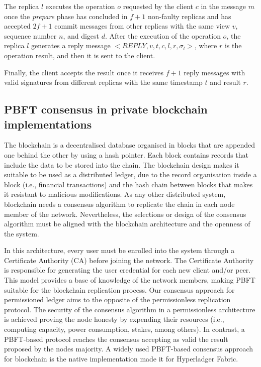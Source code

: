 \documentclass[conference]{IEEEtran}
\begin{document}
The replica $l$ executes the operation $o$ requested by the client $c$ in the message $m$ once the \textit{prepare} phase has concluded in $f+1$ non-faulty replicas and has accepted $2f+1$ commit messages from other replicas with the same view $v$, sequence number $n$, and digest $d$. After the execution of the operation $o$, the replica $l$ generates a reply message $<\textit{REPLY},v,t,c,l,r,\sigma_l>$, where $r$ is the operation result, and then it is sent to the client.

Finally, the client accepts the result once it receives $f+1$ reply messages with valid signatures from different replicas with the same timestamp $t$ and result $r$.

\subsection{PBFT consensus in private blockchain implementations}
\label{PBFTHF}

The blockchain is a decentralised database organised in blocks that are appended one behind the other by using a hash pointer. Each block contains records that include the data to be stored into the chain. The blockchain design makes it suitable to be used as a distributed ledger, due to the record organisation inside a block (i.e., financial transactions) and the hash chain between blocks that makes it resistant to malicious modifications. As any other distributed system, blockchain needs a consensus algorithm to replicate the chain in each node member of the network. Nevertheless, the selections or design of the consensus algorithm must be aligned with the blockchain architecture and the openness of the system.

In this architecture, every user must be enrolled into the system through a Certificate Authority (CA) before joining the network. The Certificate Authority is responsible for generating the user credential for each new client and/or peer. This model provides a base of knowledge of the network members, making PBFT suitable for the blockchain replication process. Our consensus approach for permissioned ledger aims to the opposite of the permissionless replication protocol. The security of the consensus algorithm in a permissionless architecture is achieved proving the node honesty by expending their resources (i.e., computing capacity, power consumption, stakes, among others). In contrast, a PBFT-based protocol reaches the consensus accepting as valid the result proposed by the nodes majority.  A widely used PBFT-based consensus approach for blockchain is the native implementation made it for Hyperladger Fabric. 
\end{document}
